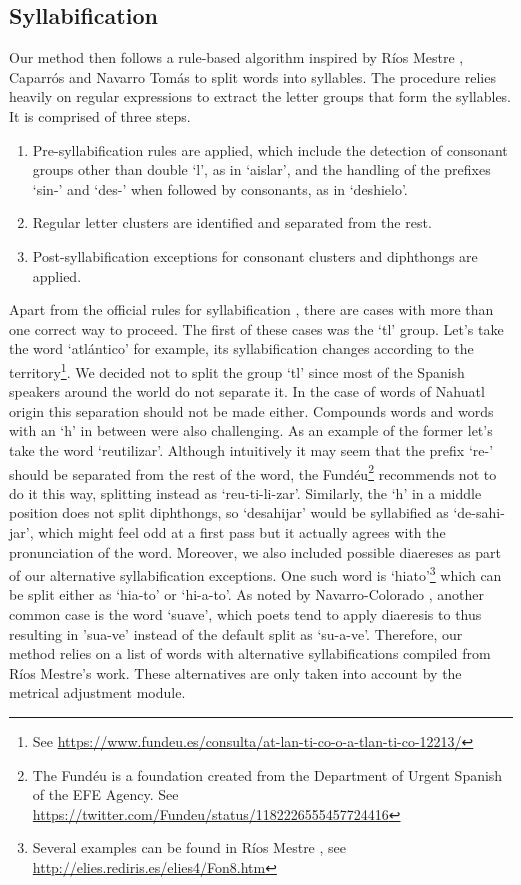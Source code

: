\documentclass[a4paper,11pt,twocolumn,twoside]{article}
\begin{document}
\subsection{Syllabification}
Our method then follows a rule-based algorithm inspired by Ríos Mestre \cite{mestre1998transcripcion}, Caparrós \cite{caparros1993metrica} and Navarro Tomás \cite{navarro1991metrica} to split words into syllables. The procedure relies heavily on regular expressions to extract the letter groups that form the syllables. It is comprised of three steps.
\begin{enumerate}
\item Pre-syllabification rules are applied, which include the detection of consonant groups other than double `l', as in `aislar', and the handling of the prefixes `sin-' and `des-' when followed by consonants, as in `deshielo'.
\item Regular letter clusters are identified and separated from the rest.
\item Post-syllabification exceptions for consonant clusters and diphthongs are applied.
\end{enumerate}
Apart from the official rules for syllabification \cite{espanola2010ortografia}, there are cases with more than one correct way to proceed. The first of these cases was the `tl' group. Let's take the word `atlántico' for example, its syllabification changes according to the territory\footnote{See \url{https://www.fundeu.es/consulta/at-lan-ti-co-o-a-tlan-ti-co-12213/}}. We decided not to split the group `tl' since most of the Spanish speakers around the world do not separate it. In the case of words of Nahuatl origin this separation should not be made either.
Compounds words and words with an `h' in between were also challenging. As an example of the former let's take the word `reutilizar'. Although intuitively it may seem that the prefix `re-' should be separated from the rest of the word, the Fundéu\footnote{The Fundéu is a foundation created from the Department of Urgent Spanish of the EFE Agency. See \url{https://twitter.com/Fundeu/status/1182226555457724416}} recommends not to do it this way, splitting instead as `reu-ti-li-zar'. Similarly, the `h' in a middle position does not split diphthongs, so `desahijar' would be syllabified as `de-sahi-jar', which might feel odd at a first pass but it actually agrees with the pronunciation of the word.
Moreover, we also included possible diaereses as part of our alternative syllabification exceptions. One such word is `hiato'\footnote{Several examples can be found in Ríos Mestre \cite{mestre1998transcripcion}, see \url{http://elies.rediris.es/elies4/Fon8.htm}} which can be split either as `hia-to' or `hi-a-to'. As noted by Navarro-Colorado \cite{navarro2017metrical}, another common case is the word `suave', which poets tend to apply diaeresis to thus resulting in 'sua-ve' instead of the default split as `su-a-ve'.  Therefore, our method relies on a list of words with alternative syllabifications compiled from Ríos Mestre's work. These alternatives are only taken into account by the metrical adjustment module.
\end{document}
